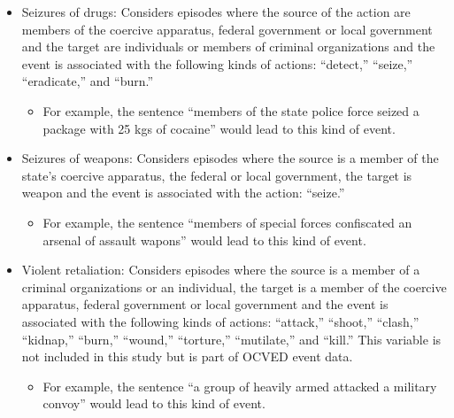 \documentclass[12pt,letterpaper]{article}
\begin{document}
\begin{itemize}
        \begin{itemize}
        \item For example, the sentence ``the Navy confiscated the speedboat'' would lead to this kind of event. 
        \end{itemize}
        
    \item Seizures of drugs:  Considers episodes where the source of the action are members of the coercive apparatus, federal government or local government and the target are individuals or members of criminal organizations and the event is associated with the following kinds of actions:  ``detect,'' ``seize,'' ``eradicate,'' and ``burn.''
        
        \begin{itemize}
        \item For example, the sentence ``members of the state police force seized a package with 25 kgs of cocaine'' would lead to this kind of event. 
        \end{itemize}
        
    \item Seizures of weapons: Considers episodes where the source is a member of the state's coercive apparatus, the federal or local government, the target is weapon and the event is associated with the action: ``seize.'' 
        
        \begin{itemize}
        \item For example, the sentence ``members of special forces confiscated an arsenal of assault wapons'' would lead to this kind of event. 
        \end{itemize}
        
    \item Violent retaliation: Considers episodes where the source is a member of a criminal organizations or an individual, the target is  a member of the coercive apparatus, federal government or local government and the event is associated with the following kinds of actions:  ``attack,'' ``shoot,'' ``clash,''  ``kidnap,''  ``burn,'' ``wound,'' ``torture,'' ``mutilate,'' and ``kill.'' This variable is not included in this study but is part of OCVED event data.        
        \begin{itemize}
        \item For example, the sentence ``a group of heavily armed attacked a military convoy'' would lead to this kind of event. 
        \end{itemize}
        
\end{itemize}
\end{document}
